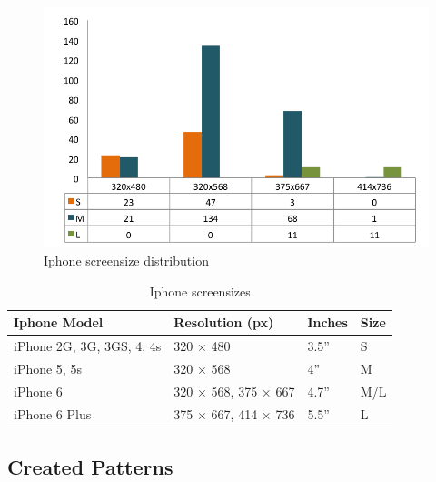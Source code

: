 {{    %
    \begin{figure}[H]
      \centering
      \includegraphics[scale=0.85]{pics/analysis/IphoneScreenDist.png}
      \caption{Iphone screensize distribution}
      \label{fig:iphoneScreenDist}
    \end{figure}

    \begin{table}[H]
      \centering
      \begin{tabular}{ l | l | l | l }
        \hline
        {\bf Iphone Model}  & {\bf Resolution (px)} & {\bf Inches} & {\bf Size} \\ \hline
        iPhone 2G, 3G, 3GS, 4, 4s  &  320 $\times$ 480  &  3.5'' & S\\
        iPhone 5, 5s        &  320 $\times$ 568  &  4'' & M \\
        iPhone 6            &  320 $\times$ 568, 375 $\times$ 667  &  4.7'' & M/L \\
        iPhone 6 Plus       &  375 $\times$ 667, 414 $\times$ 736  &  5.5'' & L \\ \hline        
      \end{tabular}
      \caption{Iphone screensizes}
      \label{tab:iphonescreen}
    \end{table}

    

  \clearpage
	\subsection{Created Patterns} \label{sec:createdpatterns}

}}
